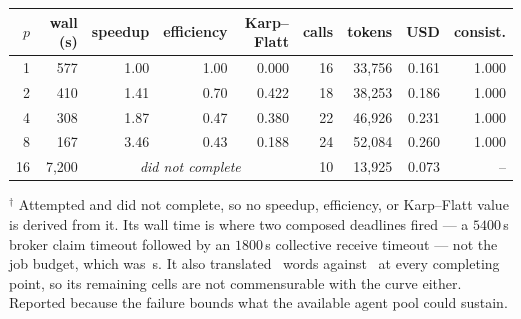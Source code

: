 \begin{tabular}{rrrrrrrrr}
\toprule
$p$ & wall (s) & speedup & efficiency & Karp--Flatt & calls & tokens & USD & consist. \\
\midrule
1 & 577 & 1.00 & 1.00 & 0.000 & 16 & 33,756 & 0.161 & 1.000 \\
2 & 410 & 1.41 & 0.70 & 0.422 & 18 & 38,253 & 0.186 & 1.000 \\
4 & 308 & 1.87 & 0.47 & 0.380 & 22 & 46,926 & 0.231 & 1.000 \\
8 & 167 & 3.46 & 0.43 & 0.188 & 24 & 52,084 & 0.260 & 1.000 \\
\midrule
16\rlap{$^\dagger$} & 7,200 & \multicolumn{3}{c}{\emph{did not complete}} & 10 & 13,925 & 0.073 & -- \\
\bottomrule
\end{tabular}

{\footnotesize $^\dagger$ Attempted and did not complete, so no speedup, efficiency, or Karp--Flatt value is derived from it. Its wall time is where two composed deadlines fired --- a $5400$\,s broker claim timeout followed by an $1800$\,s collective receive timeout --- not the job budget, which was \NScalingFailedTimeout\,s. It also translated \NScalingFailedWords\ words against \NScalingBaseWords\ at every completing point, so its remaining cells are not commensurable with the curve either. Reported because the failure bounds what the available agent pool could sustain.}
